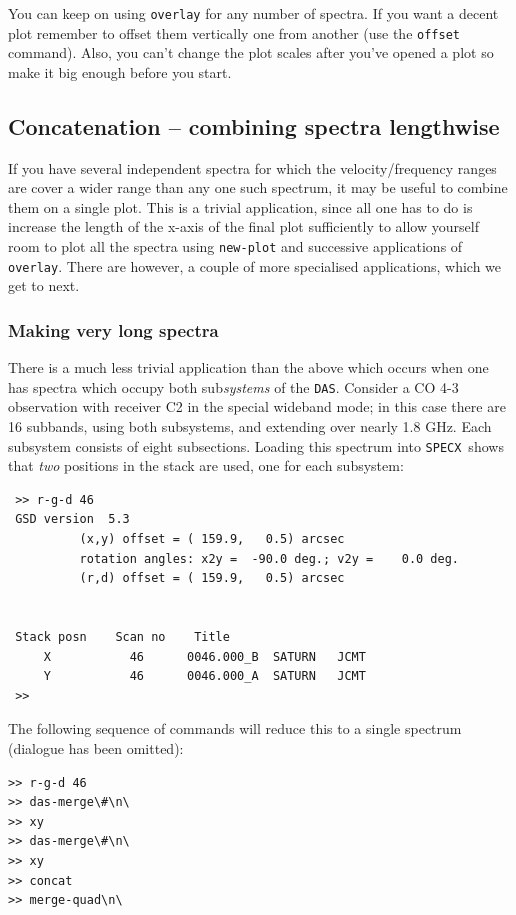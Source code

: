 \documentclass[11pt,twoside]{article}
\newcommand{\SPECX}{{\tt SPECX}}
\newcommand{\das}{{\tt DAS}}
\begin{document}
You can keep on using {\tt overlay} for any number of spectra. If you
want a decent plot remember to offset them vertically one from another
(use the {\tt offset} command). Also, you can't change the plot scales
after you've opened a plot so make it big enough before you start.

\subsection{Concatenation -- combining spectra lengthwise}
If you have several independent spectra for which the
velocity/frequency ranges are cover a wider range than any one such
spectrum, it may be useful to combine them on a single plot. This is a
trivial application, since all one has to do is increase the length of
the x-axis of the final plot sufficiently to allow yourself room to
plot all the spectra using {\tt new-plot} and successive applications
of {\tt overlay}. There are however, a couple of more specialised
applications, which we get to next.

\subsubsection{Making very long spectra}
\label{sec:long-spectra}
There is a much less trivial application than the above which occurs
when one has spectra which occupy both sub{\it systems} of the \das .
Consider a CO 4-3 observation with receiver C2 in the
special wideband mode; in this case there are 16 subbands, using both
subsystems, and extending over nearly 1.8 GHz. Each subsystem consists
of eight subsections.  Loading this spectrum into \SPECX\ shows that
{\it two} positions in the stack are used, one for each subsystem:

\begin{verbatim}
 >> r-g-d 46
 GSD version  5.3
          (x,y) offset = ( 159.9,   0.5) arcsec
          rotation angles: x2y =  -90.0 deg.; v2y =    0.0 deg.
          (r,d) offset = ( 159.9,   0.5) arcsec
 
 
 Stack posn    Scan no    Title
     X           46      0046.000_B  SATURN   JCMT 
     Y           46      0046.000_A  SATURN   JCMT 
 >> 
\end{verbatim}

The following sequence of commands will reduce this to a single
spectrum (dialogue has been omitted):

\begin{verbatim}
>> r-g-d 46
>> das-merge\#\n\
>> xy
>> das-merge\#\n\
>> xy
>> concat
>> merge-quad\n\
\end{verbatim}
\end{document}
